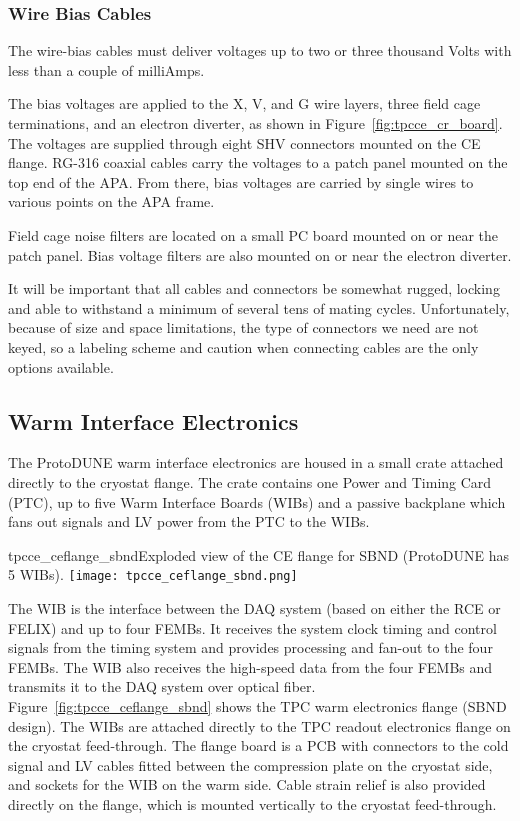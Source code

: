 \subsubsection{Wire Bias Cables}
\label{subsubsec:ce_bias_cable}

The wire-bias cables must deliver voltages up to two or three thousand Volts with less than a 
couple of milliAmps.

The bias voltages are applied to the X, V, and G wire layers, three field cage terminations, 
and an electron diverter, as shown in Figure~\ref{fig:tpcce_cr_board}. The voltages are supplied 
through eight SHV connectors mounted on the CE flange. RG-316 coaxial cables carry the voltages to a patch panel 
mounted on the top end of the APA. From there, bias voltages are carried by single wires to 
various points on the APA frame.

Field cage noise filters are located on a small PC board mounted on or near the patch panel. 
Bias voltage filters are also mounted on or near the electron diverter.

It will be important that all cables and connectors be somewhat rugged,
locking and able to withstand a minimum of several tens of mating cycles.
Unfortunately, because of size and space limitations, the type of connectors we need are not keyed,
so a labeling scheme and caution when connecting cables are the only options available.

\subsection{Warm Interface Electronics}
\label{subsec:warm_interface_elec}

The ProtoDUNE warm interface electronics are housed in a small crate
attached directly to the cryostat flange.  The crate contains one
Power and Timing Card (PTC), up to five Warm Interface Boards (WIBs) and a passive
backplane which fans out signals and LV power from the PTC to the WIBs.

\begin{cdrfigure}{tpcce_ceflange_sbnd}{Exploded view of 
the CE flange for SBND (ProtoDUNE has 5 WIBs).}
\texttt{[image: tpcce\_ceflange\_sbnd.png]}
\end{cdrfigure}

The WIB is the interface between the
DAQ system (based on either the RCE or FELIX) and up to four
FEMBs. It receives the system clock timing and control signals from the
timing system and provides processing and fan-out to the four
FEMBs. The WIB also receives the high-speed data from the four 
FEMBs and transmits it to the DAQ system over optical
fiber.  Figure~\ref{fig:tpcce_ceflange_sbnd} shows the TPC warm electronics
flange (SBND design). The WIBs are attached directly to the TPC
readout electronics flange on the cryostat feed-through. The flange
board is a PCB with connectors to the cold signal and LV cables fitted
between the compression plate on the cryostat side, and sockets for
the WIB on the warm side. Cable strain relief is also provided
directly on the flange, which is mounted vertically to the cryostat
feed-through.

